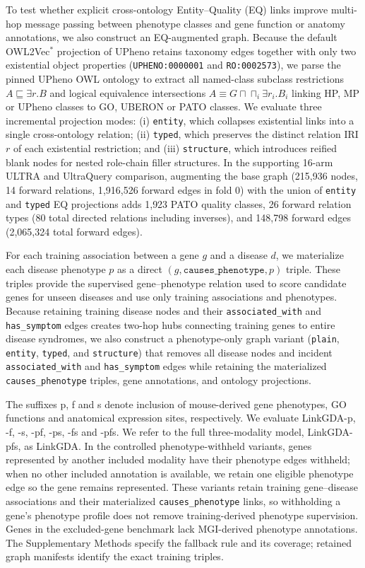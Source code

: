 \documentclass[webpdf,contemporary,large]{oup-authoring-template}%
\theoremstyle{thmstyleone}%
\theoremstyle{thmstyletwo}%
\theoremstyle{thmstylethree}%
\newcommand{\method}{LinkGDA}
\newcommand{\projection}{OWL2Vec$^*$}
\begin{document}
To test whether explicit cross-ontology Entity--Quality (EQ) links improve
multi-hop message passing between phenotype classes and gene function or
anatomy annotations, we also construct an EQ-augmented graph. Because the
default \projection{} projection of UPheno retains taxonomy edges together with
only two existential object properties (\texttt{UPHENO:0000001} and
\texttt{RO:0002573}), we parse the pinned UPheno OWL ontology to extract all
named-class subclass restrictions $A \sqsubseteq \exists r.B$ and logical
equivalence intersections $A \equiv G \sqcap \sqcap_i \exists r_i.B_i$ linking
HP, MP or UPheno classes to GO, UBERON or PATO classes. We evaluate three
incremental projection modes: (i) \texttt{entity}, which collapses existential
links into a single cross-ontology relation; (ii) \texttt{typed}, which
preserves the distinct relation IRI $r$ of each existential restriction; and
(iii) \texttt{structure}, which introduces reified blank nodes for nested
role-chain filler structures. In the supporting 16-arm ULTRA and UltraQuery comparison,
augmenting the base graph (215{,}936 nodes, 14 forward relations, 1{,}916{,}526
forward edges in fold 0) with the union of \texttt{entity} and \texttt{typed}
EQ projections adds 1{,}923 PATO quality classes, 26 forward relation types
(80 total directed relations including inverses), and 148{,}798 forward edges
(2{,}065{,}324 total forward edges).

For each training association between a gene $g$ and a disease $d$, we
materialize each disease phenotype $p$ as a direct
$(g,\texttt{causes\_phenotype},p)$ triple. These triples provide the
supervised gene--phenotype relation used to score candidate genes for
unseen diseases and use only training associations and phenotypes. Because
retaining training disease nodes and their \texttt{associated\_with} and
\texttt{has\_symptom} edges creates two-hop hubs connecting training genes to
entire disease syndromes, we also construct a phenotype-only graph variant
(\texttt{plain}, \texttt{entity}, \texttt{typed}, and \texttt{structure}) that
removes all disease nodes and incident \texttt{associated\_with} and
\texttt{has\_symptom} edges while retaining the materialized
\texttt{causes\_phenotype} triples, gene annotations, and ontology projections.

The suffixes p, f and s denote inclusion of
mouse-derived gene phenotypes, GO functions and anatomical expression
sites, respectively. We evaluate \method{}-p, -f, -s, -pf, -ps, -fs
and -pfs. We refer to the full three-modality model, \method{}-pfs, as
\method{}. In the controlled phenotype-withheld variants, genes represented by
another included modality have their phenotype edges withheld; when no other
included annotation is available, we retain one eligible phenotype edge so the
gene remains represented. These variants retain training gene--disease
associations and their materialized \texttt{causes\_phenotype} links, so
withholding a gene's phenotype profile does not remove training-derived
phenotype supervision. Genes in the excluded-gene benchmark lack
MGI-derived phenotype annotations. The Supplementary Methods specify the fallback rule and its coverage;
retained graph manifests identify the exact training triples.
\end{document}

